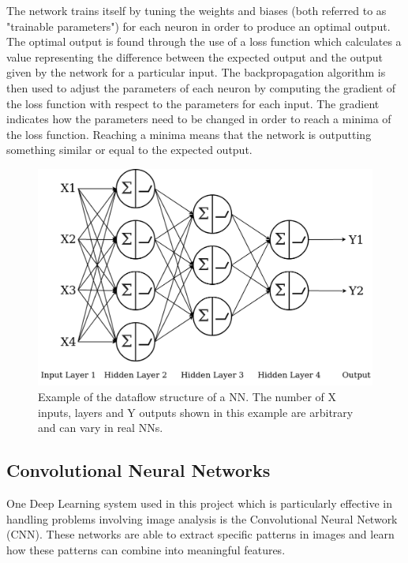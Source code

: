 \documentclass{l4proj}
\begin{document}
The network trains itself by tuning the weights and biases (both referred to as "trainable parameters") for each neuron in order to produce an optimal output. The optimal output is found through the use of a loss function which calculates a value representing the difference between the expected output and the output given by the network for a particular input. The backpropagation algorithm is then used to adjust the parameters of each neuron by computing the gradient of the loss function with respect to the parameters for each input. The gradient indicates how the parameters need to be changed in order to reach a minima of the loss function. Reaching a minima means that the network is outputting something similar or equal to the expected output. 

\begin{figure}[h]
    \centering
    \includegraphics[width=1.0\linewidth]{images/NeuralNet.png}    

    \caption{Example of the dataflow structure of a NN. The number of X inputs, layers and Y outputs shown in this example are arbitrary and can vary in real NNs.}

    \label{fig:neuralnet} 
\end{figure}

\subsection{Convolutional Neural Networks}
\label{convolution}
One Deep Learning system used in this project which is particularly effective in handling problems involving image analysis is the Convolutional Neural Network (CNN). These networks are able to extract specific patterns in images and learn how these patterns can combine into meaningful features.
\end{document}

